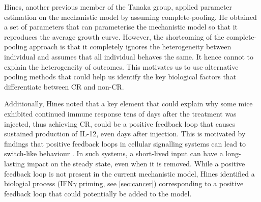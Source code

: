 \documentclass[11pt]{article}
\begin{document}
Hines, another previous member of the Tanaka group, applied parameter estimation on the mechanistic model by assuming complete-pooling. He obtained a set of parameters that can parameterise the mechanistic model so that it reproduces the average growth curve. However, the shortcoming of the complete-pooling approach is that it completely ignores the heterogeneity between individual and assumes that all individual behaves the same. It hence cannot to explain the heterogeneity of outcomes. This motivates us to use alternative pooling methods that could help us identify the key biological factors that differentiate between CR and non-CR.

Additionally, Hines noted that a key element that could explain why some mice exhibited continued immune response tens of days after the treatment was injected, thus achieving CR, could be a positive feedback loop that causes sustained production of IL-12, even days after injection. This is motivated by findings that positive feedback loops in cellular signalling systems can lead to switch-like behaviour \cite{bistable}. In such systems, a short-lived input can have a long-lasting impact on the steady state, even when it is removed. While a positive feedback loop is not present in the current mechanistic model, Hines identified a biologial process (IFN$\gamma$ priming, see \ref{sec:cancer}) corresponding to a positive feedback loop that could potentially be added to the model.


\end{document}
